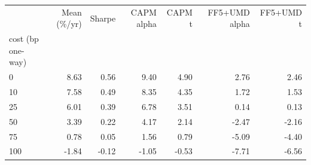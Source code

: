 \begin{tabular}{lrrrrrr}
\toprule
 & Mean (\%/yr) & Sharpe & CAPM alpha & CAPM t & FF5+UMD alpha & FF5+UMD t \\
cost (bp one-way) &  &  &  &  &  &  \\
\midrule
0 & 8.63 & 0.56 & 9.40 & 4.90 & 2.76 & 2.46 \\
10 & 7.58 & 0.49 & 8.35 & 4.35 & 1.72 & 1.53 \\
25 & 6.01 & 0.39 & 6.78 & 3.51 & 0.14 & 0.13 \\
50 & 3.39 & 0.22 & 4.17 & 2.14 & -2.47 & -2.16 \\
75 & 0.78 & 0.05 & 1.56 & 0.79 & -5.09 & -4.40 \\
100 & -1.84 & -0.12 & -1.05 & -0.53 & -7.71 & -6.56 \\
\bottomrule
\end{tabular}

